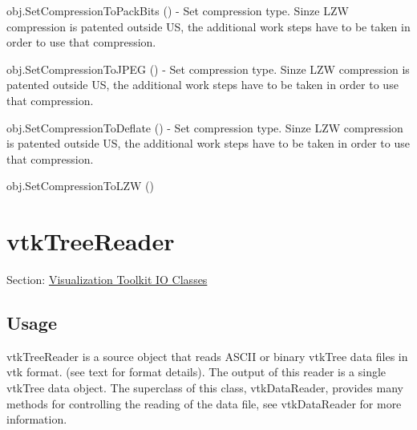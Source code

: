 \begin{DoxyItemize}
\item {\ttfamily obj.\-Set\-Compression\-To\-Pack\-Bits ()} -\/ Set compression type. Sinze L\-Z\-W compression is patented outside U\-S, the additional work steps have to be taken in order to use that compression.  
\item {\ttfamily obj.\-Set\-Compression\-To\-J\-P\-E\-G ()} -\/ Set compression type. Sinze L\-Z\-W compression is patented outside U\-S, the additional work steps have to be taken in order to use that compression.  
\item {\ttfamily obj.\-Set\-Compression\-To\-Deflate ()} -\/ Set compression type. Sinze L\-Z\-W compression is patented outside U\-S, the additional work steps have to be taken in order to use that compression.  
\item {\ttfamily obj.\-Set\-Compression\-To\-L\-Z\-W ()}  
\end{DoxyItemize}\hypertarget{vtkio_vtktreereader}{}\section{vtk\-Tree\-Reader}\label{vtkio_vtktreereader}
Section\-: \hyperlink{sec_vtkio}{Visualization Toolkit I\-O Classes} \hypertarget{vtkwidgets_vtkxyplotwidget_Usage}{}\subsection{Usage}\label{vtkwidgets_vtkxyplotwidget_Usage}
vtk\-Tree\-Reader is a source object that reads A\-S\-C\-I\-I or binary vtk\-Tree data files in vtk format. (see text for format details). The output of this reader is a single vtk\-Tree data object. The superclass of this class, vtk\-Data\-Reader, provides many methods for controlling the reading of the data file, see vtk\-Data\-Reader for more information.

